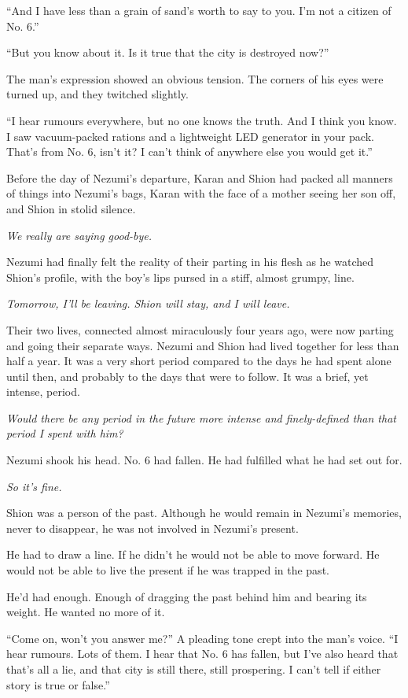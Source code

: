 ``And I have less than a grain of sand's worth to say to you. I'm not a
citizen of No. 6.''

``But you know about it. Is it true that the city is destroyed now?''

The man's expression showed an obvious tension. The corners of his eyes
were turned up, and they twitched slightly.

``I hear rumours everywhere, but no one knows the truth. And I think you
know. I saw vacuum-packed rations and a lightweight LED
generator in your pack. That's from No. 6, isn't it? I can't think of
anywhere else you would get it.''

Before the day of Nezumi's departure, Karan and Shion had packed all
manners of things into Nezumi's bags, Karan with the face of a mother
seeing her son off, and Shion in stolid silence.

\emph{We really are saying good-bye.}

Nezumi had finally felt the reality of their parting in his flesh as he
watched Shion's profile, with the boy's lips pursed in a stiff, almost
grumpy, line.

\emph{Tomorrow, I'll be leaving. Shion will stay, and I will leave.}

Their two lives, connected almost miraculously four years ago, were now
parting and going their separate ways. Nezumi and Shion had lived
together for less than half a year. It was a very short period compared
to the days he had spent alone until then, and probably to the days that
were to follow. It was a brief, yet intense, period.

\emph{Would there be any period in the future more intense and finely-defined
than that period I spent with him?}

Nezumi shook his head. No. 6 had fallen. He had fulfilled what he had
set out for.

\emph{So it's fine.}

Shion was a person of the past. Although he would remain in Nezumi's
memories, never to disappear, he was not involved in Nezumi's present.

He had to draw a line. If he didn't he would not be able to move
forward. He would not be able to live the present if he was trapped in
the past.

He'd had enough. Enough of dragging the past behind him and
bearing its weight. He wanted no more of it.

``Come on, won't you answer me?'' A pleading tone crept into the man's
voice. ``I hear rumours. Lots of them. I hear that No. 6 has fallen, but
I've also heard that that's all a lie, and that city is still there,
still prospering. I can't tell if either story is true or false.''

